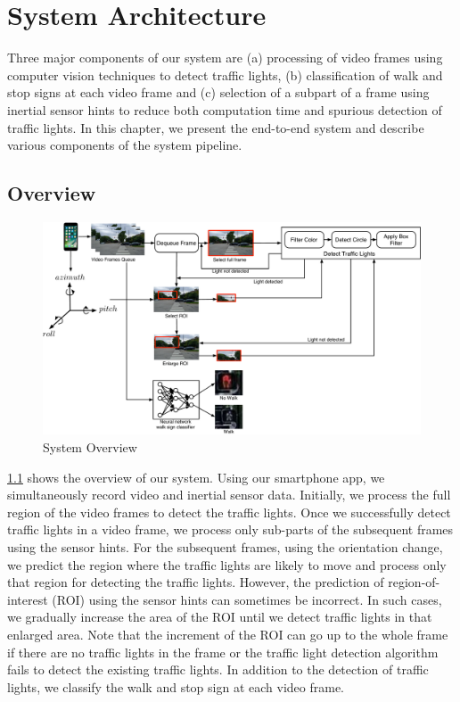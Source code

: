 \chapter{System Architecture}
\label{c:system}
Three major components of our system are (a) processing of video frames using computer vision techniques to detect traffic lights, (b) classification of walk and stop signs at each video frame and (c) selection of a subpart of a frame using inertial sensor hints to reduce both computation time and spurious detection of traffic lights. 
In this chapter, we present the end-to-end system and describe various components of the system pipeline.


\section{Overview}
\label{s:overview}

\begin{figure}
\centering
\includegraphics[width=6.2in]{figures/sysdia3.pdf}
\caption{System Overview}
\label{f:sys_dia}
\end{figure}

\ref{f:sys_dia} shows the overview of our system.
Using our smartphone app, we simultaneously record video and inertial sensor data.
Initially, we process the full region of the video frames to detect the traffic lights.
Once we successfully detect traffic lights in a video frame, we process only sub-parts of the subsequent frames using the sensor hints. 
For the subsequent frames, using the orientation change, we predict the region where the traffic lights are likely to move and process only that region for detecting the traffic lights.
However, the prediction of region-of-interest (ROI) using the sensor hints can sometimes be incorrect.
In such cases, we gradually increase the area of the ROI until we detect traffic lights in that enlarged area. 
Note that the increment of the ROI can go up to the whole frame if there are no traffic lights in the frame or the traffic light detection algorithm fails to detect the existing traffic lights. 
In addition to the detection of traffic lights, we classify the walk and stop sign at each video frame.

